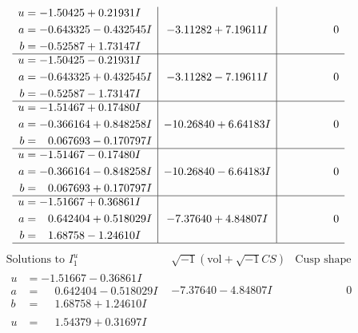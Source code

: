 \documentclass[1p]{elsarticle_modified}
\theoremstyle{definition}
\newcommand{\I}{\sqrt{-1}}
\begin{document}
$$\begin{array}{c|c|c}
\begin{aligned}
u &= -1.50425 + 0.21931 I \\
a &= -0.643325 - 0.432545 I \\
b &= -0.52587 + 1.73147 I\end{aligned}
 & -3.11282 + 7.19611 I & \phantom{-0.000000 } 0 \\ \hline\begin{aligned}
u &= -1.50425 - 0.21931 I \\
a &= -0.643325 + 0.432545 I \\
b &= -0.52587 - 1.73147 I\end{aligned}
 & -3.11282 - 7.19611 I & \phantom{-0.000000 } 0 \\ \hline\begin{aligned}
u &= -1.51467 + 0.17480 I \\
a &= -0.366164 + 0.848258 I \\
b &= \phantom{-}0.067693 - 0.170797 I\end{aligned}
 & -10.26840 + 6.64183 I & \phantom{-0.000000 } 0 \\ \hline\begin{aligned}
u &= -1.51467 - 0.17480 I \\
a &= -0.366164 - 0.848258 I \\
b &= \phantom{-}0.067693 + 0.170797 I\end{aligned}
 & -10.26840 - 6.64183 I & \phantom{-0.000000 } 0 \\ \hline\begin{aligned}
u &= -1.51667 + 0.36861 I \\
a &= \phantom{-}0.642404 + 0.518029 I \\
b &= \phantom{-}1.68758 - 1.24610 I\end{aligned}
 & -7.37640 + 4.84807 I & \phantom{-0.000000 } 0\\
 \hline 
 \end{array}$$\newpage$$\begin{array}{c|c|c}  
\text{Solutions to }I^u_{1}& \I (\text{vol} + \sqrt{-1}CS) & \text{Cusp shape}\\
 \hline 
\begin{aligned}
u &= -1.51667 - 0.36861 I \\
a &= \phantom{-}0.642404 - 0.518029 I \\
b &= \phantom{-}1.68758 + 1.24610 I\end{aligned}
 & -7.37640 - 4.84807 I & \phantom{-0.000000 } 0 \\ \hline\begin{aligned}
u &= \phantom{-}1.54379 + 0.31697 I \\

\end{aligned}
\end{array}$$
\end{document}
